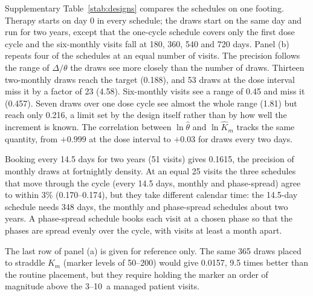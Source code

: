 Supplementary Table~\ref{stab:designs} compares the schedules on one footing. Therapy starts on
day 0 in every schedule; the draws start on the same day and run for two years, except that the
one-cycle schedule covers only the first dose cycle and the six-monthly visits fall at 180, 360,
540 and 720 days. Panel (b) repeats four of the schedules at an equal number of visits. The precision follows the range of $\Delta/\theta$ the draws see more closely than the
number of draws. Thirteen two-monthly draws reach the target (0.188), and 53 draws at the dose
interval miss it by a factor of 23 (4.58). Six-monthly visits see a range of 0.45 and miss it
(0.457). Seven draws
over one dose cycle see almost the whole range (1.81) but reach only 0.216, a limit set by the
design itself rather than by how well the increment is known. The correlation between
$\ln\hat\theta$ and $\ln\hat K_m$ tracks the same quantity, from $+0.999$ at the dose interval to
$+0.03$ for draws every two days.

Booking every 14.5 days for two years (51 visits) gives 0.1615, the precision of monthly draws at
fortnightly density. At an equal 25 visits the three schedules that move through the cycle
(every 14.5 days, monthly and phase-spread) agree to within 3\% (0.170--0.174), but they take
different calendar time: the 14.5-day schedule needs 348 days, the monthly and phase-spread
schedules about two years. A phase-spread schedule books each
visit at a chosen phase so that the phases are spread evenly over the cycle, with visits at
least a month apart.

The last row of panel (a) is given for reference only. The same 365 draws placed to straddle
$K_m$ (marker levels of 50--200\uM) would give 0.0157, 9.5 times better than the routine
placement, but they require holding the marker an order of magnitude above the 3--10\uM\ a
managed patient visits.

